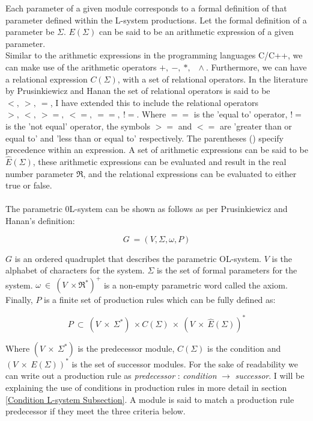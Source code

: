 Each parameter of a given module corresponds to a formal definition of that parameter defined within the L-system productions. Let the formal definition of a parameter be $\Sigma$. $ E(\Sigma) $ can be said to be an arithmetic expression of a given parameter.\\ Similar to the arithmetic expressions in the programming languages C/C++, we can make use of the arithmetic operators $ +,~ -,~ *,~ \,~ \wedge{}$. Furthermore, we can have a relational expression $C(\Sigma)$, with a set of relational operators. In the literature by Prusinkiewicz and Hanan the set of relational operators is said to be $<,~ >,~ =$, I have extended this to include the relational operators $>,~ <,~ >=,~ <=,~ ==,~ !=$. Where $==$ is the 'equal to' operator, $!=$ is the 'not equal' operator, the symbols $>=$ and $<=$ are 'greater than or equal to' and 'less than or equal to' respectively. The parentheses () specify precedence within an expression. A set of arithmetic expressions can be said to be $\hat{E} (\Sigma)$,  these arithmetic expressions can be evaluated and result in the real number parameter $\Re $, and the relational expressions can be evaluated to either true or false. \\
\\
The parametric 0L-system can be shown as follows as per Prusinkiewicz and Hanan's definition:

\begin{equation}
G~ = (V, \Sigma, \omega, P)
\end{equation}
\vspace{5mm}

\noindent
$G$ is an ordered quadruplet that describes the parametric OL-system. $V$ is the alphabet of characters for the system. $\Sigma$ is the set of formal parameters for the system. $\omega~ \in~ (V~ \times \Re^*)^+$ is a non-empty parametric word called the axiom. Finally, $P$ is a finite set of production rules which can be fully defined as:

\begin{equation}
P~ \subset~ (V~ \times~ \Sigma^*)~ \times C(\Sigma)~ \times~ (V~ \times~ \hat{E}(\Sigma))^*
\end{equation}

\noindent
Where $(V~ \times~ \Sigma^*) $ is the predecessor module, $C(\Sigma) $ is the condition and $(V~ \times~ E(\Sigma))^* $ is the set of successor modules. For the sake of readability we can write out a production rule as \textit{predecessor} : \textit{condition} $\rightarrow$ \textit{successor}. I will be explaining the use of conditions in production rules in more detail in section \ref{Condition L-system Subsection}.
A module is said to match a production rule predecessor if they meet the three criteria below.

